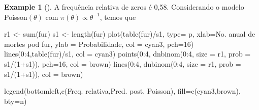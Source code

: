 \documentclass[
  letterpaper,
  DIV=11,
  numbers=noendperiod]{scrreprt}
\newenvironment{Shaded}{\begin{snugshade}}{\end{snugshade}}
\newcommand{\AttributeTok}[1]{\textcolor[rgb]{0.40,0.45,0.13}{#1}}
\newcommand{\DecValTok}[1]{\textcolor[rgb]{0.68,0.00,0.00}{#1}}
\newcommand{\FunctionTok}[1]{\textcolor[rgb]{0.28,0.35,0.67}{#1}}
\newcommand{\NormalTok}[1]{\textcolor[rgb]{0.00,0.23,0.31}{#1}}
\newcommand{\OtherTok}[1]{\textcolor[rgb]{0.00,0.23,0.31}{#1}}
\newcommand{\SpecialCharTok}[1]{\textcolor[rgb]{0.37,0.37,0.37}{#1}}
\newcommand{\StringTok}[1]{\textcolor[rgb]{0.13,0.47,0.30}{#1}}
\theoremstyle{definition}
\theoremstyle{plain}
\theoremstyle{definition}
\newtheorem{example}{Example}[chapter]
\theoremstyle{remark}
\begin{document}
\begin{example}[]
A frequência relativa de zeros é 0,58. Considerando o modelo
Poisson\((\theta)\) com \(\pi(\theta)\propto \theta^{-1}\), temos que

\begin{Shaded}
\begin{Highlighting}[]
\NormalTok{r1 }\OtherTok{\textless{}{-}} \FunctionTok{sum}\NormalTok{(fur)}
\NormalTok{s1 }\OtherTok{\textless{}{-}} \FunctionTok{length}\NormalTok{(fur)}
\FunctionTok{plot}\NormalTok{(}\FunctionTok{table}\NormalTok{(fur)}\SpecialCharTok{/}\NormalTok{s1, }\AttributeTok{type=} \StringTok{\textquotesingle{}p\textquotesingle{}}\NormalTok{, }\AttributeTok{xlab=}\StringTok{\textquotesingle{}No. anual de mortes pod fur\textquotesingle{}}\NormalTok{, }\AttributeTok{ylab =} \StringTok{\textquotesingle{}Probabilidade\textquotesingle{}}\NormalTok{, }\AttributeTok{col =} \StringTok{\textquotesingle{}cyan3\textquotesingle{}}\NormalTok{, }\AttributeTok{pch=}\DecValTok{16}\NormalTok{)}
\FunctionTok{lines}\NormalTok{(}\DecValTok{0}\SpecialCharTok{:}\DecValTok{4}\NormalTok{,}\FunctionTok{table}\NormalTok{(fur)}\SpecialCharTok{/}\NormalTok{s1, }\AttributeTok{col =} \StringTok{\textquotesingle{}cyan3\textquotesingle{}}\NormalTok{)}
\FunctionTok{points}\NormalTok{(}\DecValTok{0}\SpecialCharTok{:}\DecValTok{4}\NormalTok{, }\FunctionTok{dnbinom}\NormalTok{(}\DecValTok{0}\SpecialCharTok{:}\DecValTok{4}\NormalTok{, }\AttributeTok{size =}\NormalTok{ r1, }\AttributeTok{prob =}\NormalTok{ s1}\SpecialCharTok{/}\NormalTok{(}\DecValTok{1}\SpecialCharTok{+}\NormalTok{s1)), }\AttributeTok{pch=}\DecValTok{16}\NormalTok{, }\AttributeTok{col =} \StringTok{\textquotesingle{}brown\textquotesingle{}}\NormalTok{)}
\FunctionTok{lines}\NormalTok{(}\DecValTok{0}\SpecialCharTok{:}\DecValTok{4}\NormalTok{, }\FunctionTok{dnbinom}\NormalTok{(}\DecValTok{0}\SpecialCharTok{:}\DecValTok{4}\NormalTok{, }\AttributeTok{size =}\NormalTok{ r1, }\AttributeTok{prob =}\NormalTok{ s1}\SpecialCharTok{/}\NormalTok{(}\DecValTok{1}\SpecialCharTok{+}\NormalTok{s1)), }\AttributeTok{col =} \StringTok{\textquotesingle{}brown\textquotesingle{}}\NormalTok{)}

\FunctionTok{legend}\NormalTok{(}\StringTok{\textquotesingle{}bottomleft\textquotesingle{}}\NormalTok{,}\FunctionTok{c}\NormalTok{(}\StringTok{\textquotesingle{}Freq. relativa\textquotesingle{}}\NormalTok{,}\StringTok{\textquotesingle{}Pred. post. Poisson\textquotesingle{}}\NormalTok{), }\AttributeTok{fill=}\FunctionTok{c}\NormalTok{(}\StringTok{\textquotesingle{}cyan3\textquotesingle{}}\NormalTok{,}\StringTok{\textquotesingle{}brown\textquotesingle{}}\NormalTok{), }\AttributeTok{bty=}\StringTok{\textquotesingle{}n\textquotesingle{}}\NormalTok{)}
\end{Highlighting}
\end{Shaded}


\end{example}
\end{document}
